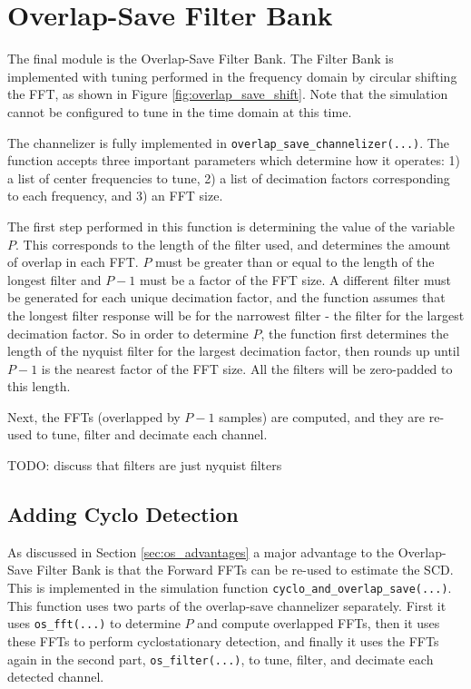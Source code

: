 \documentclass[12pt]{report}
\begin{document}
\section{Overlap-Save Filter Bank}
\label{sec:sim_os}
The final module is the Overlap-Save Filter Bank. The Filter Bank is
implemented with tuning performed in the frequency domain by circular shifting
the FFT, as shown in Figure \ref{fig:overlap_save_shift}. Note that the
simulation cannot be configured to tune in the time domain at this time.

The channelizer is fully implemented in \texttt{overlap\_save\_channelizer(...)}.
The function accepts three important parameters which determine how it
operates: 1) a list of center frequencies to tune, 2) a list of decimation
factors corresponding to each frequency, and 3) an FFT size.

The first step performed in this function is determining the value of the
variable $P$. This corresponds to the length of the filter used, and determines
the amount of overlap in each FFT. $P$ must be greater than or equal to the
length of the longest filter and $P-1$ must be a factor of the FFT size.
A different filter must be generated for each unique decimation factor, and the
function assumes that the longest filter response will be for the narrowest
filter - the filter for the largest decimation factor. So in order to determine
$P$, the function first determines the length of the nyquist filter for the
largest decimation factor, then rounds up until $P-1$ is the nearest factor of
the FFT size. All the filters will be zero-padded to this length.

Next, the FFTs (overlapped by $P-1$ samples) are computed, and they are re-used
to tune, filter and decimate each channel.

TODO: discuss that filters are just nyquist filters

\subsection{Adding Cyclo Detection}
\label{sec:sim_os_cyclo}
As discussed in Section \ref{sec:os_advantages} a major advantage to the
Overlap-Save Filter Bank is that the Forward FFTs can be re-used to estimate
the SCD. This is implemented in the simulation function
\texttt{cyclo\_and\_overlap\_save(...)}. This function uses two parts of the
overlap-save channelizer separately.  First it uses \texttt{os\_fft(...)} to
determine $P$ and compute overlapped FFTs, then it uses these FFTs to perform
cyclostationary detection, and finally it uses the FFTs again in the second part,
\texttt{os\_filter(...)}, to tune, filter, and decimate each detected channel.
\end{document}
